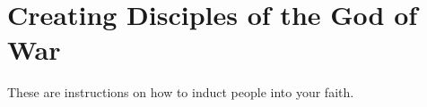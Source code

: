 \documentclass[green]{guardians}
\begin{document}
\name{\gExample{}}

\section{Creating Disciples of the God of War}
These are instructions on how to induct people into your faith.

	
\end{document}
